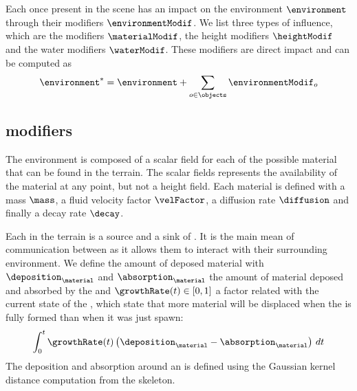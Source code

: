 



\section{}
\label{sec:semantic-representation_materials}
Each  once present in the scene has an impact on the environment $\environment$ through their modifiers $\environmentModif$. We list three types of influence, which are the  modifiers $\materialModif$, the height modifiers $\heightModif$ and the water modifiers $\waterModif$. These modifiers are direct impact and can be computed as 
\begin{align*}
    \environment^* = \environment + \sum_{o \in \objects}{ \environmentModif_o }
\end{align*}

\subsection{ modifiers}
The environment is composed of a scalar field for each of the possible material that can be found in the terrain. The scalar fields represents the availability of the material at any point, but not a height field. Each material is defined with a mass $\mass$, a fluid velocity factor $\velFactor$, a diffusion rate $\diffusion$ and finally a decay rate $\decay$.

Each  in the terrain is a source and a sink of . It is the main mean of communication between  as it allows them to interact with their surrounding environment. We define the amount of deposed material with $\deposition_\material$ and $\absorption_\material$ the amount of material deposed and absorbed by the  and $\growthRate(t) \in [0, 1]$ a factor related with the current state of the , which state that more material will be displaced when the  is fully formed than when it was just spawn:
\begin{align*}
    \int_{0}^{t} {\growthRate(t) \left( \deposition_\material - \absorption_\material \right) \,dt}
\end{align*} 
The deposition and absorption around an  is defined using the Gaussian kernel distance computation from the skeleton.

